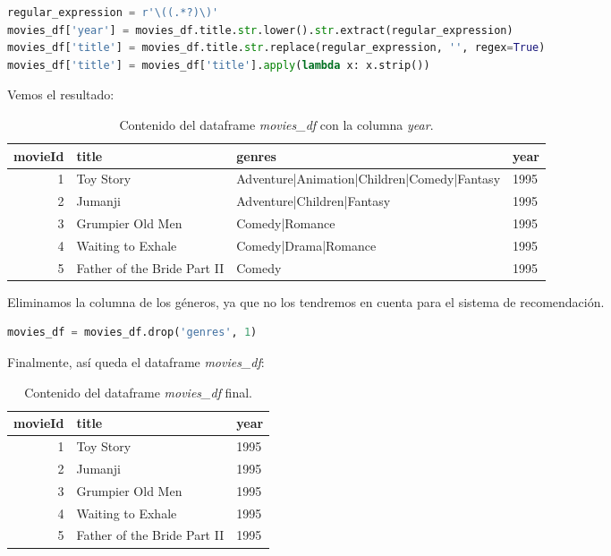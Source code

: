 \documentclass{uimppracticas}
\begin{document}
\begin{lstlisting}[language=python]
regular_expression = r'\((.*?)\)'
movies_df['year'] = movies_df.title.str.lower().str.extract(regular_expression)
movies_df['title'] = movies_df.title.str.replace(regular_expression, '', regex=True)
movies_df['title'] = movies_df['title'].apply(lambda x: x.strip())
\end{lstlisting}

Vemos el resultado:

\begin{table}[h]
	\centering
	\begin{tabular}{rlll}
		\toprule
		movieId &                        title &                                       genres &  year \\
		\midrule
		1 &                    Toy Story &  Adventure|Animation|Children|Comedy|Fantasy &  1995 \\
		2 &                      Jumanji &                   Adventure|Children|Fantasy &  1995 \\
		3 &             Grumpier Old Men &                               Comedy|Romance &  1995 \\
		4 &            Waiting to Exhale &                         Comedy|Drama|Romance &  1995 \\
		5 &  Father of the Bride Part II &                                       Comedy &  1995 \\
		\bottomrule
	\end{tabular}
	\caption{Contenido del dataframe \textit{movies\_df} con la columna \textit{year}.}
	\label{movies_df_years}
\end{table}

Eliminamos la columna de los géneros, ya que no los tendremos en cuenta para el sistema de recomendación.

\begin{lstlisting}[language=python]
movies_df = movies_df.drop('genres', 1)
\end{lstlisting}

Finalmente, así queda el dataframe \textit{movies\_df}:

\begin{table}[h]
	\centering
	\begin{tabular}{rll}
		\toprule
		movieId &                        title &  year \\
		\midrule
		1 &                    Toy Story &  1995 \\
		2 &                      Jumanji &  1995 \\
		3 &             Grumpier Old Men &  1995 \\
		4 &            Waiting to Exhale &  1995 \\
		5 &  Father of the Bride Part II &  1995 \\
		\bottomrule
	\end{tabular}
	\caption{Contenido del dataframe \textit{movies\_df} final.}
	\label{movies_df_final}
\end{table}
\end{document}
